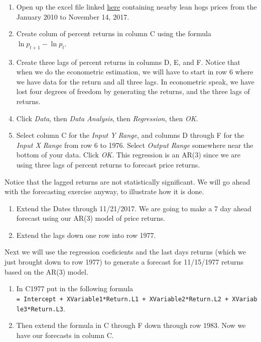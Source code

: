 \documentclass[
]{book}
\begin{document}
\begin{enumerate}
\def\labelenumi{\arabic{enumi}.}
\item
  Open up the excel file linked \href{Excel-files/LeanHogs.xlsx}{here} containing nearby lean hogs prices from the January 2010 to November 14, 2017.
\item
  Create colum of percent returns in column C using the formula \(\ln{p_{t+1}} - \ln{p_{t}}\).
\item
  Create three lags of percent returns in columns D, E, and F. Notice that when we do the econometric estimation, we will have to start in row 6 where we have data for the return and all three lags. In econometric speak, we have lost four degrees of freedom by generating the returns, and the three lags of returns.
\item
  Click \emph{Data}, then \emph{Data Analysis}, then \emph{Regression}, then \emph{OK}.
\item
  Select column C for the \emph{Input Y Range}, and columns D through F for the \emph{Input X Range} from row 6 to 1976. Select \emph{Output Range} somewhere near the bottom of your data. Click \emph{OK}. This regression is an AR(3) since we are using three lags of percent returns to forecast price returns.
\end{enumerate}

Notice that the lagged returns are not statistically significant. We will go ahead with the forecasting exercise anyway, to illustrate how it is done.

\begin{enumerate}
\def\labelenumi{\arabic{enumi}.}
\setcounter{enumi}{5}
\item
  Extend the Dates through 11/21/2017. We are going to make a 7 day ahead forecast using our AR(3) model of price returns.
\item
  Extend the lags down one row into row 1977.
\end{enumerate}

Next we will use the regression coeficients and the last days returns (which we just brought down to row 1977) to generate a forecast for 11/15/1977 returns based on the AR(3) model.

\begin{enumerate}
\def\labelenumi{\arabic{enumi}.}
\setcounter{enumi}{7}
\item
  In C1977 put in the following formula \texttt{=\ Intercept\ +\ XVariable1*Return.L1\ +\ XVariable2*Return.L2\ +\ XVariable3*Return.L3}.
\item
  Then extend the formula in C through F down through row 1983. Now we have our forecasts in column C.
\end{enumerate}
\end{document}
